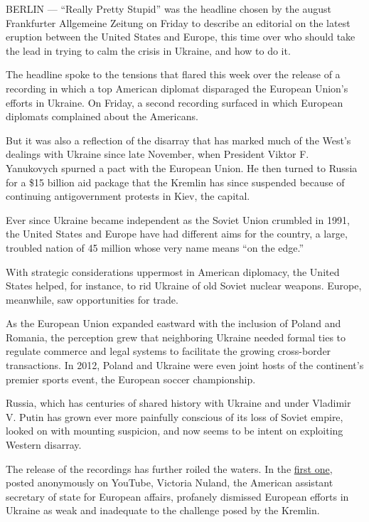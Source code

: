 BERLIN --- ``Really Pretty Stupid'' was the headline chosen by the
august Frankfurter Allgemeine Zeitung on Friday to describe an editorial
on the latest eruption between the United States and Europe, this time
over who should take the lead in trying to calm the crisis in Ukraine,
and how to do it.

The headline spoke to the tensions that flared this week over the
release of a recording in which a top American diplomat disparaged the
European Union's efforts in Ukraine. On Friday, a second recording
surfaced in which European diplomats complained about the Americans.

But it was also a reflection of the disarray that has marked much of the
West's dealings with Ukraine since late November, when President Viktor
F. Yanukovych spurned a pact with the European Union. He then turned to
Russia for a \$15 billion aid package that the Kremlin has since
suspended because of continuing antigovernment protests in Kiev, the
capital.

Ever since Ukraine became independent as the Soviet Union crumbled in
1991, the United States and Europe have had different aims for the
country, a large, troubled nation of 45 million whose very name means
``on the edge.''

With strategic considerations uppermost in American diplomacy, the
United States helped, for instance, to rid Ukraine of old Soviet nuclear
weapons. Europe, meanwhile, saw opportunities for trade.

As the European Union expanded eastward with the inclusion of Poland and
Romania, the perception grew that neighboring Ukraine needed formal ties
to regulate commerce and legal systems to facilitate the growing
cross-border transactions. In 2012, Poland and Ukraine were even joint
hosts of the continent's premier sports event, the European soccer
championship.

Russia, which has centuries of shared history with Ukraine and under
Vladimir V. Putin has grown ever more painfully conscious of its loss of
Soviet empire, looked on with mounting suspicion, and now seems to be
intent on exploiting Western disarray.

The release of the recordings has further roiled the waters. In the
\href{https://www.youtube.com/watch?v=MSxaa-67yGM\#t=89}{first one},
posted anonymously on YouTube, Victoria Nuland, the American assistant
secretary of state for European affairs, profanely dismissed European
efforts in Ukraine as weak and inadequate to the challenge posed by the
Kremlin.

